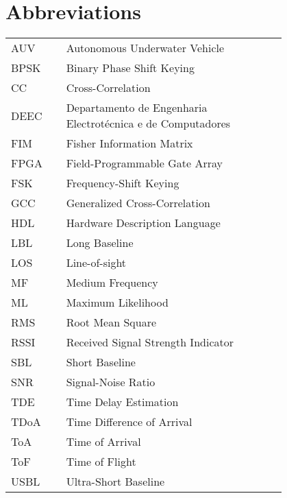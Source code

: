 \chapter*{Abbreviations}

\begin{flushleft}
\begin{tabular}{l p{0.8\linewidth}}
AUV		& Autonomous Underwater Vehicle \\
BPSK    & Binary Phase Shift Keying \\
CC 		  & Cross-Correlation \\
DEEC	& Departamento de Engenharia Electrotécnica e de Computadores \\
FIM		  & Fisher Information Matrix \\
FPGA    & Field-Programmable Gate Array \\
FSK		  & Frequency-Shift Keying \\
GCC      & Generalized Cross-Correlation \\
HDL		 & Hardware Description Language\\
LBL		  & Long Baseline\\
LOS		 & Line-of-sight\\
MF		  & Medium Frequency \\
ML		  & Maximum Likelihood \\
RMS		 & Root Mean Square \\
RSSI 	  & Received Signal Strength Indicator \\
SBL		  & Short Baseline \\
SNR		 & Signal-Noise Ratio\\
TDE 	 & Time Delay Estimation \\
TDoA    & Time Difference of Arrival \\
ToA	   	& Time of Arrival \\
ToF		 & Time of Flight \\
USBL    & Ultra-Short Baseline
\end{tabular}
\end{flushleft}